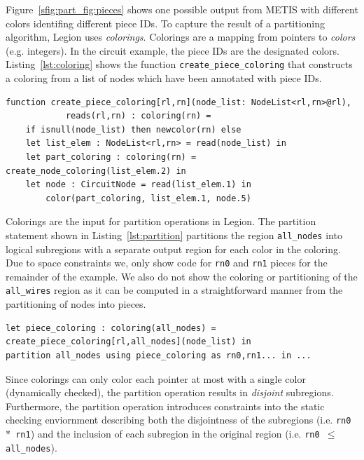 Figure~\ref{sfig:part_fig:pieces} shows one possible output from
METIS with different colors identifing different piece IDs.  To capture
the result of a partitioning algorithm, Legion uses {\em colorings}.
Colorings are a mapping from pointers to {\em colors} (e.g. integers).  In
the circuit example, the piece IDs are the designated colors. 
Listing~\ref{lst:coloring} shows the function {\tt create\_piece\_coloring}
that constructs a coloring from a list of nodes which have been 
annotated with piece IDs.

\begin{lstlisting}[label={lst:coloring},caption={Coloring Construction}]
function create_piece_coloring[rl,rn](node_list: NodeList<rl,rn>@rl),
            reads(rl,rn) : coloring(rn) = 
    if isnull(node_list) then newcolor(rn) else
    let list_elem : NodeList<rl,rn> = read(node_list) in
    let part_coloring : coloring(rn) = create_node_coloring(list_elem.2) in
    let node : CircuitNode = read(list_elem.1) in
        color(part_coloring, list_elem.1, node.5)
\end{lstlisting}

Colorings are the input for partition operations in Legion.  The partition
statement shown in Listing~\ref{lst:partition} partitions the region
{\tt all\_nodes} into logical subregions with a separate output region
for each color in the coloring.  Due to space constraints we, only show
code for {\tt rn0} and {\tt rn1} pieces for the remainder of the example.  We also
do not show the coloring or partitioning of the {\tt all\_wires} region as
it can be computed in a straightforward manner from the partitioning of
nodes into pieces.

\begin{lstlisting}[label={lst:partition},caption={Partition Operation Example}]
let piece_coloring : coloring(all_nodes) = create_piece_coloring[rl,all_nodes](node_list) in
partition all_nodes using piece_coloring as rn0,rn1... in ...
\end{lstlisting}

Since colorings can only color each pointer at most with a single color
(dynamically checked), the partition operation results in 
{\em disjoint} subregions.  Furthermore, the partition operation
introduces constraints into the static checking enviornment describing
both the disjointness of the subregions (i.e. {\tt rn0 $*$ rn1})
and the inclusion of each subregion in the original region
(i.e. {\tt rn0 $\leq$ all\_nodes}).


